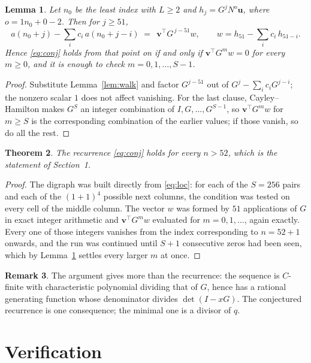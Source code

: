 \documentclass[11pt,a4paper]{article}
\theoremstyle{plain}
\newtheorem{theorem}{Theorem}
\newtheorem{lemma}[theorem]{Lemma}
\theoremstyle{definition}
\newtheorem{remark}[theorem]{Remark}
\begin{document}
\begin{lemma}\label{lem:crit}
Let $n_0$ be the least index with $L\ge2$ and $h_j=G^{j}N^{o}\mathbf{u}$, where
$o=1n_0+0-2$. Then for $j\ge51$,
\[
a(n_0+j)-\sum_i c_i\,a(n_0+j-i)\;=\;\,\mathbf{v}^{\!\top}G^{\,j-51}w,
\qquad w=h_{51}-\sum_i c_i\,h_{51-i} .
\]
Hence \eqref{eq:conj} holds from that point on if and only if
$\mathbf{v}^{\!\top}G^{m}w=0$ for every $m\ge0$, and it is enough to check
$m=0,1,\dots,S-1$.
\end{lemma}

\begin{proof}
Substitute Lemma~\ref{lem:walk} and factor $G^{j-51}$ out of
$G^{j}-\sum_ic_iG^{j-i}$; the nonzero scalar $1$ does not affect
vanishing. For the last clause, Cayley--Hamilton makes $G^{S}$ an integer combination of
$I,G,\dots,G^{S-1}$, so $\mathbf{v}^{\!\top}G^{m}w$ for $m\ge S$ is the corresponding
combination of the earlier values; if those vanish, so do all the rest.
\end{proof}

\begin{theorem}
The recurrence \eqref{eq:conj} holds for every $n>52$, which is the statement of
Section~1.
\end{theorem}

\begin{proof}
The digraph was built directly from \eqref{eq:loc}: for each of the $S=256$ pairs and each
of the $(1+1)^{4}$ possible next columns, the condition was tested on every cell of
the middle column. The vector $w$ was formed by $51$ applications of $G$ in exact integer
arithmetic and $\mathbf{v}^{\!\top}G^{m}w$ evaluated for $m=0,1,\dots$, again exactly.
Every one of those integers vanishes from the index corresponding to $n=52+1$ onwards,
and the run was continued until $S+1$ consecutive zeros had been seen, which by
Lemma~\ref{lem:crit} settles every larger $m$ at once.
\end{proof}

\begin{remark}
The argument gives more than the recurrence: the sequence is $C$-finite with characteristic
polynomial dividing that of $G$, hence has a rational generating function whose denominator
divides $\det(I-xG)$. The conjectured recurrence is one consequence; the minimal one is a
divisor of $q$.
\end{remark}

\section{Verification}
\end{document}
